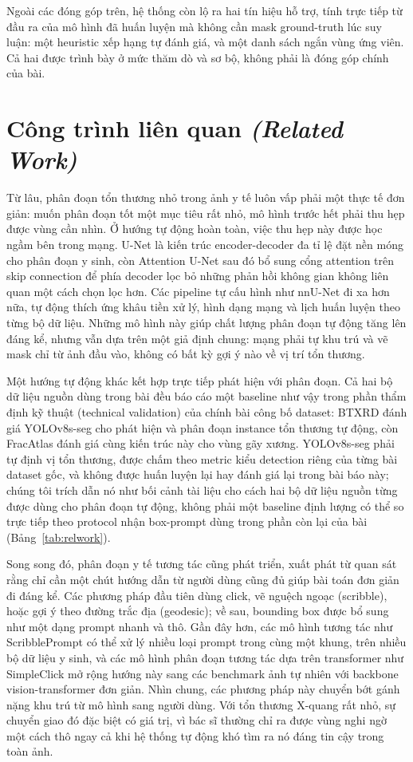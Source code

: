 \documentclass[11pt]{article}
\newcommand{\enlabel}[1]{{\small\itshape\color{gray} (#1)}}
\begin{document}
Ngoài các đóng góp trên, hệ thống còn lộ ra hai tín hiệu hỗ trợ, tính trực tiếp từ đầu ra của mô hình đã huấn luyện mà không cần mask ground-truth lúc suy luận: một heuristic xếp hạng tự đánh giá, và một danh sách ngắn vùng ứng viên. Cả hai được trình bày ở mức thăm dò và sơ bộ, không phải là đóng góp chính của bài.

\section{Công trình liên quan \enlabel{Related Work}}
Từ lâu, phân đoạn tổn thương nhỏ trong ảnh y tế luôn vấp phải một thực tế đơn giản: muốn phân đoạn tốt một mục tiêu rất nhỏ, mô hình trước hết phải thu hẹp được vùng cần nhìn. Ở hướng tự động hoàn toàn, việc thu hẹp này được học ngầm bên trong mạng. U-Net là kiến trúc encoder-decoder đa tỉ lệ đặt nền móng cho phân đoạn y sinh, còn Attention U-Net sau đó bổ sung cổng attention trên skip connection để phía decoder lọc bỏ những phản hồi không gian không liên quan một cách chọn lọc hơn. Các pipeline tự cấu hình như nnU-Net đi xa hơn nữa, tự động thích ứng khâu tiền xử lý, hình dạng mạng và lịch huấn luyện theo từng bộ dữ liệu. Những mô hình này giúp chất lượng phân đoạn tự động tăng lên đáng kể, nhưng vẫn dựa trên một giả định chung: mạng phải tự khu trú và vẽ mask chỉ từ ảnh đầu vào, không có bất kỳ gợi ý nào về vị trí tổn thương.

Một hướng tự động khác kết hợp trực tiếp phát hiện với phân đoạn. Cả hai bộ dữ liệu nguồn dùng trong bài đều báo cáo một baseline như vậy trong phần thẩm định kỹ thuật (technical validation) của chính bài công bố dataset: BTXRD đánh giá YOLOv8s-seg cho phát hiện và phân đoạn instance tổn thương tự động, còn FracAtlas đánh giá cùng kiến trúc này cho vùng gãy xương. YOLOv8s-seg phải tự định vị tổn thương, được chấm theo metric kiểu detection riêng của từng bài dataset gốc, và không được huấn luyện lại hay đánh giá lại trong bài báo này; chúng tôi trích dẫn nó như bối cảnh tài liệu cho cách hai bộ dữ liệu nguồn từng được dùng cho phân đoạn tự động, không phải một baseline định lượng có thể so trực tiếp theo protocol nhận box-prompt dùng trong phần còn lại của bài (Bảng~\ref{tab:relwork}).

Song song đó, phân đoạn y tế tương tác cũng phát triển, xuất phát từ quan sát rằng chỉ cần một chút hướng dẫn từ người dùng cũng đủ giúp bài toán đơn giản đi đáng kể. Các phương pháp đầu tiên dùng click, vẽ nguệch ngoạc (scribble), hoặc gợi ý theo đường trắc địa (geodesic); về sau, bounding box được bổ sung như một dạng prompt nhanh và thô. Gần đây hơn, các mô hình tương tác như ScribblePrompt có thể xử lý nhiều loại prompt trong cùng một khung, trên nhiều bộ dữ liệu y sinh, và các mô hình phân đoạn tương tác dựa trên transformer như SimpleClick mở rộng hướng này sang các benchmark ảnh tự nhiên với backbone vision-transformer đơn giản. Nhìn chung, các phương pháp này chuyển bớt gánh nặng khu trú từ mô hình sang người dùng. Với tổn thương X-quang rất nhỏ, sự chuyển giao đó đặc biệt có giá trị, vì bác sĩ thường chỉ ra được vùng nghi ngờ một cách thô ngay cả khi hệ thống tự động khó tìm ra nó đáng tin cậy trong toàn ảnh.
\end{document}
